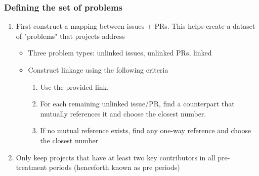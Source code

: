 \documentclass[12pt,notitlepage]{article}
\begin{document}
\subsubsection{Defining the set of problems}
\begin{enumerate}
    \item First construct a mapping between issues + PRs. This helps create a dataset of "problems" that projects address
    \begin{itemize}
        \item Three problem types: unlinked issues, unlinked PRs, linked
        \item Construct linkage using the following criteria
        \begin{enumerate}
          \item Use the provided link.
          \item For each remaining unlinked issue/PR, find a counterpart that mutually references it and choose the closest number.
          \item If no mutual reference exists, find any one-way reference and choose the closest number
        \end{enumerate}
    \end{itemize}
    \item Only keep projects that have at least two key contributors in all pre-treatment periods (henceforth known as pre periods)
\end{enumerate}
\end{document}
